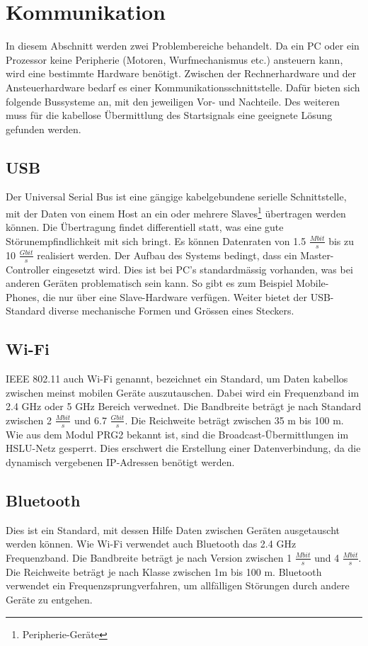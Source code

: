 ﻿\section{Kommunikation}
In diesem Abschnitt werden zwei Problembereiche behandelt. Da ein PC oder ein Prozessor keine Peripherie (Motoren, Wurfmechanismus etc.) ansteuern kann, wird eine bestimmte Hardware benötigt. Zwischen der Rechnerhardware und der Ansteuerhardware bedarf es einer Kommunikationsschnittstelle. Dafür bieten sich folgende Bussysteme an, mit den jeweiligen Vor- und Nachteile. Des weiteren muss für die kabellose Übermittlung des Startsignals eine geeignete Lösung gefunden werden.

\subsection{USB}
Der Universal Serial Bus ist eine gängige kabelgebundene serielle Schnittstelle, mit der Daten von einem Host an ein oder mehrere Slaves\footnote{Peripherie-Geräte} übertragen werden können. Die Übertragung findet differentiell statt, was eine gute Störunempfindlichkeit mit sich bringt. Es können Datenraten von 1.5 $\frac{Mbit}{s}$ bis zu 10 $\frac{Gbit}{s}$ realisiert werden. Der Aufbau des Systems bedingt, dass ein Master-Controller eingesetzt wird. Dies ist bei PC's standardmässig vorhanden, was bei anderen Geräten problematisch sein kann. So gibt es zum Beispiel Mobile-Phones, die nur über eine Slave-Hardware verfügen. Weiter bietet der USB-Standard diverse mechanische Formen und Grössen eines Steckers.

\subsection{Wi-Fi}
IEEE 802.11 auch Wi-Fi genannt, bezeichnet ein Standard, um Daten kabellos zwischen meinst mobilen Geräte auszutauschen. Dabei wird ein Frequenzband im 2.4 GHz oder 5 GHz Bereich verwednet. Die Bandbreite beträgt je nach Standard zwischen 2 $\frac{Mbit}{s}$ und 6.7 $\frac{Gbit}{s}$. Die Reichweite beträgt zwischen 35 m bis 100 m. Wie aus dem Modul PRG2 bekannt ist, sind die Broadcast-Übermittlungen im HSLU-Netz gesperrt. Dies erschwert die Erstellung einer Datenverbindung, da die dynamisch vergebenen IP-Adressen benötigt werden.

\subsection{Bluetooth}
Dies ist ein Standard, mit dessen Hilfe Daten zwischen Geräten ausgetauscht werden können. Wie Wi-Fi verwendet auch Bluetooth das 2.4 GHz Frequenzband. Die Bandbreite beträgt je nach Version zwischen 1 $\frac{Mbit}{s}$ und 4 $\frac{Mbit}{s}$. Die Reichweite beträgt je nach Klasse zwischen 1m bis 100 m. Bluetooth verwendet ein Frequenzsprungverfahren, um allfälligen Störungen durch andere Geräte zu entgehen.